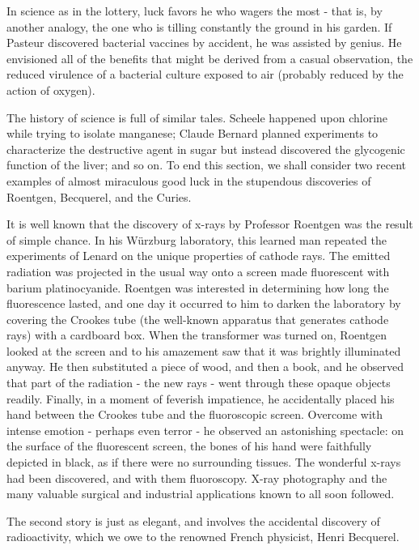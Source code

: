 \documentclass{article}
\begin{document}
In science as in the lottery, luck favors he who wagers the most - that is, by another analogy, the one who is tilling constantly the ground in his garden. If Pasteur discovered bacterial vaccines by accident, he was assisted by genius. He envisioned all of the benefits that might be derived from a casual observation, the reduced virulence of a bacterial culture exposed to air (probably reduced by the action of oxygen).

The history of science is full of similar tales. Scheele happened upon chlorine while trying to isolate manganese; Claude Bernard planned experiments to characterize the destructive agent in sugar but instead discovered the glycogenic function of the liver; and so on. To end this section, we shall consider two recent examples of almost miraculous good luck in the stupendous discoveries of Roentgen, Becquerel, and the Curies.

It is well known that the discovery of x-rays by Professor Roentgen was the result of simple chance. In his Würzburg laboratory, this learned man repeated the experiments of Lenard on the unique properties of cathode rays. The emitted radiation was projected in the usual way onto a screen made fluorescent with barium platinocyanide. Roentgen was interested in determining how long the fluorescence lasted, and one day it occurred to him to darken the laboratory by covering the Crookes tube (the well-known apparatus that generates cathode rays) with a cardboard box. When the transformer was turned on, Roentgen looked at the screen and to his amazement saw that it was brightly illuminated anyway. He then substituted a piece of wood, and then a book, and he observed that part of the radiation - the new rays - went through these opaque objects readily. Finally, in a moment of feverish impatience, he accidentally placed his hand between the Crookes tube and the fluoroscopic screen. Overcome with intense emotion - perhaps even terror - he observed an astonishing spectacle: on the surface of the fluorescent screen, the bones of his hand were faithfully depicted in black, as if there were no surrounding tissues. The wonderful x-rays had been discovered, and with them fluoroscopy. X-ray photography and the many valuable surgical and industrial applications known to all soon followed.

The second story is just as elegant, and involves the accidental discovery of radioactivity, which we owe to the renowned French physicist, Henri Becquerel.
\end{document}
